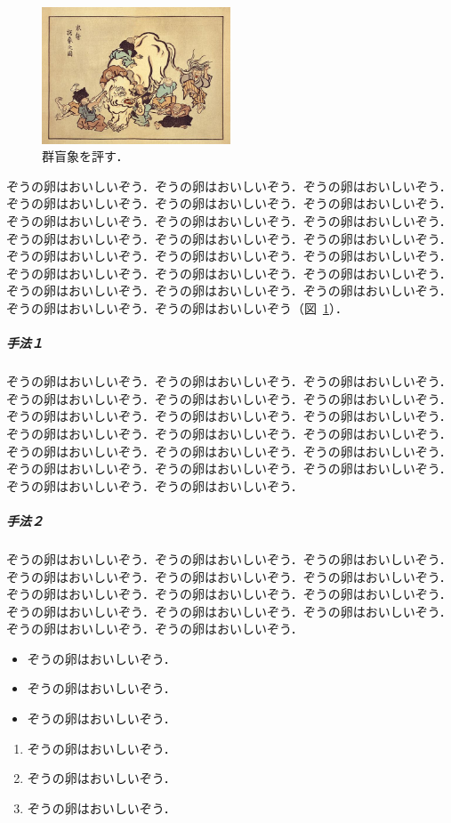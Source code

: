 \documentclass[
	10pt,
	a4j,		%
	twocolumn,	%
	uplatex
]{jsarticle}
\begin{document}
\begin{figure}[t]
	\centering
	\includegraphics[clip,width=0.5\textwidth]{fig/elephant.jpg}
	\caption{
		群盲象を評す．
		\label{fig:elephant}
	}
\end{figure}

ぞうの卵はおいしいぞう．ぞうの卵はおいしいぞう．ぞうの卵はおいしいぞう．ぞうの卵はおいしいぞう．ぞうの卵はおいしいぞう．ぞうの卵はおいしいぞう．ぞうの卵はおいしいぞう．ぞうの卵はおいしいぞう．ぞうの卵はおいしいぞう．ぞうの卵はおいしいぞう．ぞうの卵はおいしいぞう．ぞうの卵はおいしいぞう．ぞうの卵はおいしいぞう．ぞうの卵はおいしいぞう．ぞうの卵はおいしいぞう．ぞうの卵はおいしいぞう．ぞうの卵はおいしいぞう．ぞうの卵はおいしいぞう．ぞうの卵はおいしいぞう．ぞうの卵はおいしいぞう．ぞうの卵はおいしいぞう．ぞうの卵はおいしいぞう．ぞうの卵はおいしいぞう（図~\ref{fig:elephant}）．

\subparagraph{手法１}
ぞうの卵はおいしいぞう．ぞうの卵はおいしいぞう．ぞうの卵はおいしいぞう．ぞうの卵はおいしいぞう．ぞうの卵はおいしいぞう．ぞうの卵はおいしいぞう．ぞうの卵はおいしいぞう．ぞうの卵はおいしいぞう．ぞうの卵はおいしいぞう．ぞうの卵はおいしいぞう．ぞうの卵はおいしいぞう．ぞうの卵はおいしいぞう．ぞうの卵はおいしいぞう．ぞうの卵はおいしいぞう．ぞうの卵はおいしいぞう．ぞうの卵はおいしいぞう．ぞうの卵はおいしいぞう．ぞうの卵はおいしいぞう．ぞうの卵はおいしいぞう．ぞうの卵はおいしいぞう．

\subparagraph{手法２}
ぞうの卵はおいしいぞう．ぞうの卵はおいしいぞう．ぞうの卵はおいしいぞう．ぞうの卵はおいしいぞう．ぞうの卵はおいしいぞう．ぞうの卵はおいしいぞう．ぞうの卵はおいしいぞう．ぞうの卵はおいしいぞう．ぞうの卵はおいしいぞう．ぞうの卵はおいしいぞう．ぞうの卵はおいしいぞう．ぞうの卵はおいしいぞう．ぞうの卵はおいしいぞう．ぞうの卵はおいしいぞう．

\begin{itemize}
	\item ぞうの卵はおいしいぞう．
	\item ぞうの卵はおいしいぞう．
	\item ぞうの卵はおいしいぞう．
\end{itemize}
\begin{enumerate}
	\item ぞうの卵はおいしいぞう．
	\item ぞうの卵はおいしいぞう．
	\item ぞうの卵はおいしいぞう．
\end{enumerate}
\end{document}

